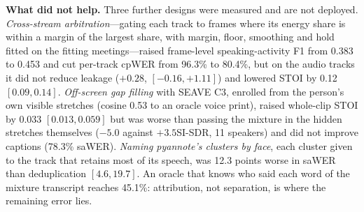 \textbf{What did not help.} Three further designs were measured and are not deployed. \emph{Cross-stream arbitration}---gating each track to frames where its energy share is within a margin of the largest share, with margin, floor, smoothing and hold fitted on the fitting meetings---raised frame-level speaking-activity F1 from 0.383 to 0.453 and cut per-track cpWER from 96.3\% to 80.4\%, but on the audio tracks it did not reduce leakage ($+0.28$\dB, $[-0.16, +1.11]$) and lowered STOI by 0.12 $[0.09, 0.14]$. \emph{Off-screen gap filling} with SEAVE C3, enrolled from the person's own visible stretches (cosine 0.53 to an oracle voice print), raised whole-clip STOI by 0.033 $[0.013, 0.059]$ but was worse than passing the mixture in the hidden stretches themselves ($-5.0$ against $+3.5$\dB SI-SDR, 11 speakers) and did not improve captions (78.3\% saWER). \emph{Naming pyannote's clusters by face}, each cluster given to the track that retains most of its speech, was 12.3 points worse in saWER than deduplication $[4.6, 19.7]$. An oracle that knows who said each word of the mixture transcript reaches 45.1\%: attribution, not separation, is where the remaining error lies.
